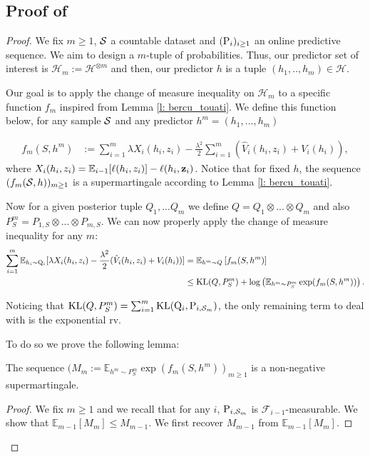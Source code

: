 \subsection{Proof of }
\label{sec: proof_main_thm_online-ht}
 \begin{proof}
   We fix $m\geq 1$, $\S$ a countable dataset and $(\P_{i})_{i\geq 1}$ an online predictive sequence. We aim to design a $m$-tuple of probabilities. Thus, our predictor set of interest is $\mathcal{H}_m:= \mathcal{H}^{\otimes m}$ and then, our predictor $h$ is a tuple $(h_1,..,h_m)\in\mathcal{H}$.

   Our goal is to apply the change of measure inequality on $\mathcal{H}_m$ to a specific function $f_m$ inspired from Lemma \ref{l: bercu_touati}. We define this function below, for any sample $\S$ and any predictor $h^m=(h_1,...,h_m)$

   \begin{align*}
   f_m(S,h^m) & := \sum_{i=1}^m \lambda X_i(h_i,z_i)  - \frac{\lambda^2}{2}\sum_{i=1}^m(\hat{V}_i(h_i,z_i) + V_i(h_i)),
   \end{align*}
   where $X_i(h_i,z_i)= \mathbb{E}_{i-1}[\ell(h_i,z_i)]- \ell(h_i,\z_i)$. Notice that for fixed $h$, the sequence $(f_m(\S,h))_{m\geq 1}$ is a supermartingale according to Lemma \ref{l: bercu_touati}.

   Now for a given posterior tuple $Q_1,...Q_m$ we define $Q= Q_1 \otimes ...\otimes Q_m$ and also $P^m_S = P_{1,S}\otimes...\otimes P_{m,S}$. We can now properly apply the change of measure inequality for any $m$:
   \begin{align*}
    \sum_{i=1}^m \mathbb{E}_{h_i\sim \Q_{i}}[\lambda X_i(h_i,z_i)  - \frac{\lambda^2}{2}(\hat{V}_i(h_i,z_i) + V_i(h_i))] & = \mathbb{E}_{h^m\sim Q}\left[ f_m(S,h^m) \right] \\
    & \leq \operatorname{KL}(Q,P^m_S) + \log \left( \mathbb{E}_{h^m\sim P^m_S}\exp(f_m(S,h^m))  \right).
   \end{align*}

   Noticing that $\operatorname{KL}(Q,P^m_S)= \sum_{i=1}^m \operatorname{KL}(\Q_{i},\P_{i,\Sm})$, the only remaining term to deal with is the exponential rv.

   To do so we prove the following lemma:

   \begin{lemma}
     The sequence $(M_m:=\mathbb{E}_{h^m\sim P^m_S}\exp(f_m(S,h^m))_{m\geq 1}$ is a non-negative supermartingale.
   \end{lemma}
   \begin{proof}
   We fix $m\geq 1$ and we recall that for any $i$, $\P_{i,\Sm}$ is $\mathcal{F}_{i-1}$-measurable. We show that $\mathbb{E}_{m-1}[M_m] \leq M_{m-1}$. We first recover $M_{m-1}$ from $\mathbb{E}_{m-1}[M_m]$.


\end{proof}
\end{proof}
